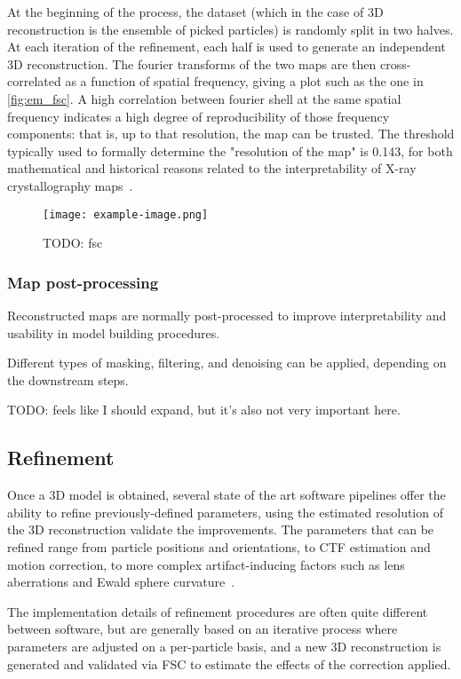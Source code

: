 At the beginning of the process, the dataset (which in the case of 3D reconstruction is the ensemble of picked particles) is randomly split in two halves.
At each iteration of the refinement, each half is used to generate an independent 3D reconstruction.
The fourier transforms of the two maps are then cross-correlated as a function of spatial frequency, giving a plot such as the one in \autoref{fig:em_fsc}.
A high correlation between fourier shell at the same spatial frequency indicates a high degree of reproducibility of those frequency components: that is, up to that resolution, the map can be trusted.
The threshold typically used to formally determine the "resolution of the map" is \num{0.143}, for both mathematical and historical reasons related to the interpretability of X-ray crystallography maps~\cite{rosenthalOptimalDeterminationParticle2003}.

\begin{figure}[ht]
    \centering
    \texttt{[image: example-image.png]}
    \caption{TODO: fsc}
    \label{fig:em_fsc}
\end{figure}

\subsubsection{Map post-processing}
Reconstructed maps are normally post-processed to improve interpretability and usability in model building procedures.

Different types of masking, filtering, and denoising can be applied, depending on the downstream steps.

TODO: feels like I should expand, but it's also not very important here.

\subsection{Refinement}\label{em_refinement}
Once a 3D model is obtained, several state of the art software pipelines offer the ability to refine previously-defined parameters, using the estimated resolution of the 3D reconstruction validate the improvements.
The parameters that can be refined range from particle positions and orientations, to CTF estimation and motion correction, to more complex artifact-inducing factors such as lens aberrations and Ewald sphere curvature~\cite{tegunovMultiparticleCryoEMRefinement2021,punjaniCryoSPARCAlgorithmsRapid2017}.

The implementation details of refinement procedures are often quite different between software, but are generally based on an iterative process where parameters are adjusted on a per-particle basis, and a new 3D reconstruction is generated and validated via FSC to estimate the effects of the correction applied.


